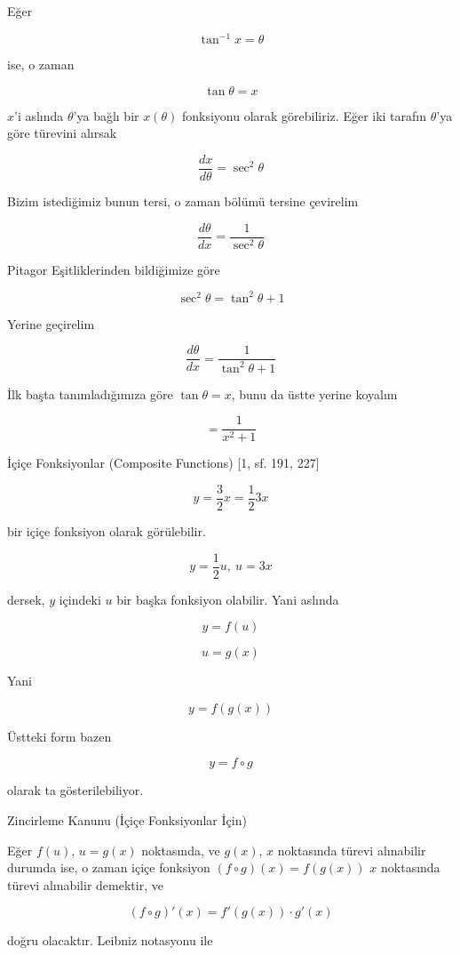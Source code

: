 \documentclass[12pt,fleqn]{article}\usepackage{../../common}
\begin{document}
Eğer

$$ \tan^{-1}x = \theta$$

ise, o zaman 

$$ \tan\theta = x $$

$x$'i aslında $\theta$'ya bağlı bir $x(\theta)$ fonksiyonu olarak görebiliriz. 
Eğer iki tarafın $\theta$'ya göre türevini alırsak

$$ \frac{dx}{d\theta} = \sec^{2}\theta $$

Bizim istediğimiz bunun tersi, o zaman bölümü tersine çevirelim

$$ \frac{d\theta}{dx} = \frac{1}{\sec^{2}\theta} $$

Pitagor Eşitliklerinden bildiğimize göre

$$ \sec^{2}\theta = \tan^{2}\theta + 1 $$

Yerine geçirelim

$$ \frac{d\theta}{dx} = \frac{1}{\tan^{2}\theta + 1} $$

İlk başta tanımladığımıza göre $\tan\theta = x$, bunu da üstte yerine
koyalım

$$  = \frac{1}{x^2 + 1} $$

\newpage

İçiçe Fonksiyonlar (Composite Functions) [1, sf. 191, 227]

$$ y = \frac{3}{2}x = \frac{1}{2}3x $$

bir içiçe fonksiyon olarak görülebilir. 

$$ y = \frac{1}{2}u, \ u=3x $$

dersek, $y$ içindeki $u$ bir başka fonksiyon olabilir. Yani aslında 

$$ y = f(u) $$

$$ u = g(x) $$

Yani

$$ y = f(g(x)) $$

Üstteki form bazen 

$$ y = f \circ g $$

olarak ta gösterilebiliyor. 

\newpage

Zincirleme Kanunu (İçiçe Fonksiyonlar İçin)

Eğer $f(u)$, $u=g(x)$ noktasında, ve $g(x)$, $x$ noktasında türevi
alınabilir durumda ise, o zaman içiçe fonksiyon $(f \circ g)(x) = f(g(x))$
$x$ noktasında türevi alınabilir demektir, ve

$$ (f \circ g)'(x) = f'(g(x)) \cdot g'(x) $$

doğru olacaktır. Leibniz notasyonu ile 
\end{document}
